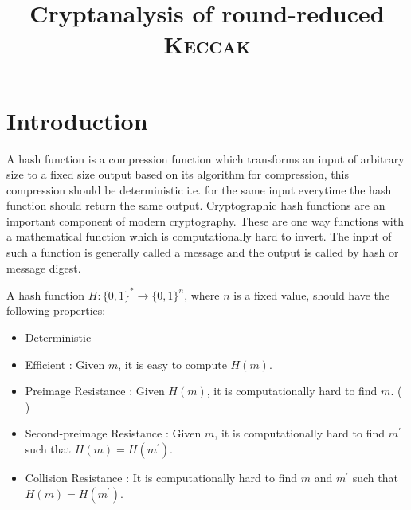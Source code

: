 \documentclass[runningheads]{llncs}
\newcommand{\KECCAK}{\mbox{\textsc{Keccak}}}
\newcommand{\SHA}{\textsc{Sha}}
\begin{document}
%
\title{Cryptanalysis of round-reduced \KECCAK}
%
%

\maketitle              %
%

%
%
%
\section{Introduction}

A hash function is a compression function which transforms an input of arbitrary size to a fixed size output based on its algorithm for compression, this compression should be deterministic i.e. for the same input everytime the hash function should return the same output. Cryptographic hash functions are an important component of modern cryptography. These are one way functions with a mathematical function which is computationally hard to invert. The input of such a function is generally called a message and the output is called by hash or message digest.

A hash function $H:\{0,1\}^* \rightarrow \{0,1\}^n $, where $n$ is a fixed value, should have the following properties: 
\begin{itemize}\setlength\itemindent{20pt}
		\item Deterministic
    \item Efficient : Given $m$, it is easy to compute $H(m)$.
        \item Preimage Resistance : Given $H(m)$, it is computationally hard to find $m$. (\textcolor{red}{ })
        \item Second-preimage Resistance : Given $m$, it is computationally hard to find $m^\prime$ such that $H(m)=H(m^\prime)$.
        \item Collision Resistance : It is computationally hard to find $m$ and $m^\prime$ such that $H(m)=H(m^\prime)$.
\end{itemize}
\end{document}
